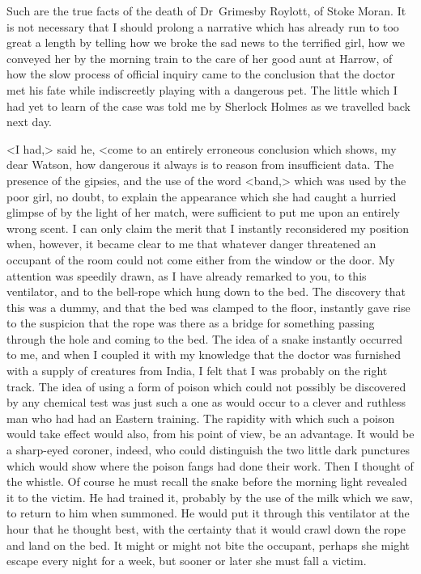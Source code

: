 Such are the true facts of the death of Dr~Grimesby Roylott, of Stoke Moran. It is not necessary that I should prolong a narrative which has already run to too great a length by telling how we broke the sad news to the terrified girl, how we conveyed her by the morning train to the care of her good aunt at Harrow, of how the slow process of official inquiry came to the conclusion that the doctor met his fate while indiscreetly playing with a dangerous pet. The little which I had yet to learn of the case was told me by Sherlock Holmes as we travelled back next day.

<I had,> said he, <come to an entirely erroneous conclusion which shows, my dear Watson, how dangerous it always is to reason from insufficient data. The presence of the gipsies, and the use of the word <band,> which was used by the poor girl, no doubt, to explain the appearance which she had caught a hurried glimpse of by the light of her match, were sufficient to put me upon an entirely wrong scent. I can only claim the merit that I instantly reconsidered my position when, however, it became clear to me that whatever danger threatened an occupant of the room could not come either from the window or the door. My attention was speedily drawn, as I have already remarked to you, to this ventilator, and to the bell-rope which hung down to the bed. The discovery that this was a dummy, and that the bed was clamped to the floor, instantly gave rise to the suspicion that the rope was there as a bridge for something passing through the hole and coming to the bed. The idea of a snake instantly occurred to me, and when I coupled it with my knowledge that the doctor was furnished with a supply of creatures from India, I felt that I was probably on the right track. The idea of using a form of poison which could not possibly be discovered by any chemical test was just such a one as would occur to a clever and ruthless man who had had an Eastern training. The rapidity with which such a poison would take effect would also, from his point of view, be an advantage. It would be a sharp-eyed coroner, indeed, who could distinguish the two little dark punctures which would show where the poison fangs had done their work. Then I thought of the whistle. Of course he must recall the snake before the morning light revealed it to the victim. He had trained it, probably by the use of the milk which we saw, to return to him when summoned. He would put it through this ventilator at the hour that he thought best, with the certainty that it would crawl down the rope and land on the bed. It might or might not bite the occupant, perhaps she might escape every night for a week, but sooner or later she must fall a victim.

